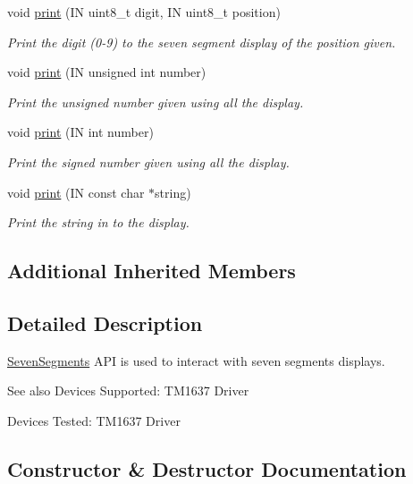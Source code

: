\begin{DoxyCompactItemize}
void \hyperlink{class_easyuino_1_1_seven_segments_a2cf9ed0d697624b5e0aa49990aba7761}{print} (IN uint8\+\_\+t digit, IN uint8\+\_\+t position)
\begin{DoxyCompactList}\small\item\em Print the digit (0-\/9) to the seven segment display of the position given. \end{DoxyCompactList}\item 
void \hyperlink{class_easyuino_1_1_seven_segments_a8eb94343f8787f95ccc9c280017ffcd9}{print} (IN unsigned int number)
\begin{DoxyCompactList}\small\item\em Print the unsigned number given using all the display. \end{DoxyCompactList}\item 
void \hyperlink{class_easyuino_1_1_seven_segments_aac9aa8753f313330c9737987ff4f2220}{print} (IN int number)
\begin{DoxyCompactList}\small\item\em Print the signed number given using all the display. \end{DoxyCompactList}\item 
void \hyperlink{class_easyuino_1_1_seven_segments_ab5792bc2318cadd334aebccfad7db77e}{print} (IN const char $\ast$string)
\begin{DoxyCompactList}\small\item\em Print the string in to the display. \end{DoxyCompactList}\end{DoxyCompactItemize}
\subsection*{Additional Inherited Members}


\subsection{Detailed Description}
\hyperlink{class_easyuino_1_1_seven_segments}{Seven\+Segments} A\+PI is used to interact with seven segments displays. 

\begin{DoxySeeAlso}{See also}
Devices Supported\+: T\+M1637 Driver 

Devices Tested\+: T\+M1637 Driver 
\end{DoxySeeAlso}


\subsection{Constructor \& Destructor Documentation}
\mbox{\label{class_easyuino_1_1_seven_segments_ae211f73df6a9f111c8cf9daec9080a12}} 
